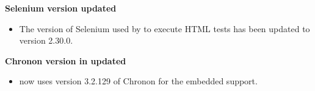 \textbf{Selenium version updated}
\begin{itemize}
\item The version of Selenium used by \app{} to execute HTML tests has been updated to version 2.30.0.
\end{itemize}

\textbf{Chronon version in \app{} updated }
\begin{itemize}
\item \app{} now uses version 3.2.129 of Chronon for the embedded support.
\end{itemize}

